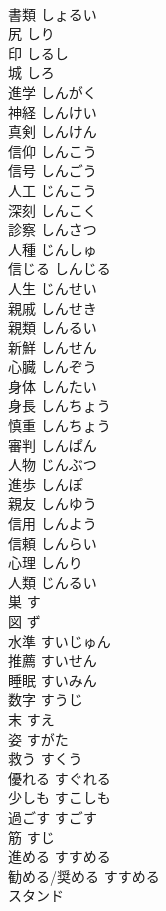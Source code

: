 \documentclass[8pt]{extreport}
\begin{document}
\begin{CJK}{UTF8}{min}
\\	書類	しょるい	
\\	尻	しり	
\\	印	しるし	
\\	城	しろ	
\\	進学	しんがく	
\\	神経	しんけい	
\\	真剣	しんけん	
\\	信仰	しんこう	
\\	信号	しんごう	
\\	人工	じんこう	
\\	深刻	しんこく	
\\	診察	しんさつ	
\\	人種	じんしゅ	
\\	信じる	しんじる	
\\	人生	じんせい	
\\	親戚	しんせき	
\\	親類	しんるい	
\\	新鮮	しんせん	
\\	心臓	しんぞう	
\\	身体	しんたい	
\\	身長	しんちょう	
\\	慎重	しんちょう	
\\	審判	しんぱん	
\\	人物	じんぶつ	
\\	進歩	しんぽ	
\\	親友	しんゆう	
\\	信用	しんよう	
\\	信頼	しんらい	
\\	心理	しんり	
\\	人類	じんるい	
\\	巣	す	
\\	図	ず	
\\	水準	すいじゅん	
\\	推薦	すいせん	
\\	睡眠	すいみん	
\\	数字	すうじ	
\\	末	すえ	
\\	姿	すがた	
\\	救う	すくう	
\\	優れる	すぐれる	
\\	少しも	すこしも	
\\	過ごす	すごす	
\\	筋	すじ	
\\	進める	すすめる	
\\	勧める/奨める	すすめる	
\\	スタンド		

\end{CJK}
\end{document}
